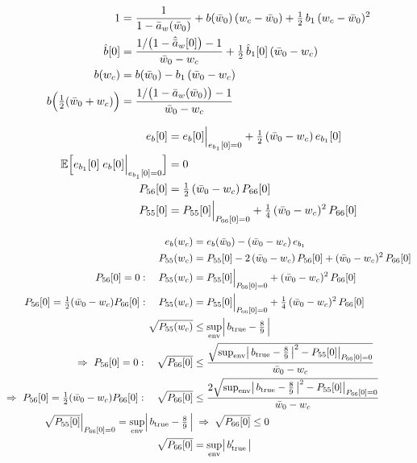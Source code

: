 \documentclass[11pt,a4paper,fontset=none]{ctexart}
\newcommand{\ba}{\bar{a}}
\newcommand{\bw}{\bar{w}}
\newcommand{\ah}{\hat{\ba}_w}
\newcommand{\bh}{\hat{b}}
\newcommand{\bhh}{\hat{b}_1}
\newcommand{\E}{\mathbb{E}}
\begin{document}
\begin{align*}
1 &= \frac{1}{1-\ba_w(\bw_0)} + b(\bw_0)\,(w_c - \bw_0) + \tfrac{1}{2}\,b_1\,(w_c - \bw_0)^{2} \\
\bh[0] &= \frac{1/\bigl(1-\ah[0]\bigr) - 1}{\bw_0 - w_c} + \tfrac{1}{2}\,\bhh[0]\,(\bw_0 - w_c) \\
b(w_c) &= b(\bw_0) - b_1\,(\bw_0 - w_c) \\
b\Bigl(\tfrac{1}{2}(\bw_0 + w_c)\Bigr) &= \frac{1/\bigl(1-\ba_w(\bw_0)\bigr) - 1}{\bw_0 - w_c}
\end{align*}

\begin{align*}
e_b[0] &= e_b[0]\Big|_{e_{b_1}[0] = 0} + \tfrac{1}{2}\,(\bw_0 - w_c)\,e_{b_1}[0] \\
\E\Bigl[e_{b_1}[0]\;e_b[0]\Big|_{e_{b_1}[0] = 0}\Bigr] &= 0 \\
P_{56}[0] &= \tfrac{1}{2}\,(\bw_0 - w_c)\,P_{66}[0] \\
P_{55}[0] &= P_{55}[0]\Big|_{P_{66}[0] = 0} + \tfrac{1}{4}\,(\bw_0 - w_c)^{2}\,P_{66}[0]
\end{align*}

\begin{align*}
e_b(w_c) &= e_b(\bw_0) - (\bw_0 - w_c)\,e_{b_1} \\
P_{55}(w_c) &= P_{55}[0] - 2\,(\bw_0 - w_c)\,P_{56}[0] + (\bw_0 - w_c)^{2}\,P_{66}[0] \\
P_{56}[0] = 0 :\quad P_{55}(w_c) &= P_{55}[0]\Big|_{P_{66}[0] = 0} + (\bw_0 - w_c)^{2}\,P_{66}[0] \\
P_{56}[0] = \tfrac{1}{2}(\bw_0 - w_c)P_{66}[0] :\quad P_{55}(w_c) &= P_{55}[0]\Big|_{P_{66}[0] = 0} + \tfrac{1}{4}\,(\bw_0 - w_c)^{2}\,P_{66}[0] \\
\sqrt{P_{55}(w_c)} &\le \sup_{\text{env}}\Bigl|\,b_{\mathrm{true}} - \tfrac{8}{9}\,\Bigr| \\
\Rightarrow\ P_{56}[0] = 0 :\quad \sqrt{P_{66}[0]} &\le \frac{\sqrt{\sup_{\text{env}}\bigl|\,b_{\mathrm{true}} - \frac{8}{9}\,\bigr|^{2} - P_{55}[0]\big|_{P_{66}[0] = 0}}}{\bw_0 - w_c} \\
\Rightarrow\ P_{56}[0] = \tfrac{1}{2}(\bw_0 - w_c)P_{66}[0] :\quad \sqrt{P_{66}[0]} &\le \frac{2\sqrt{\sup_{\text{env}}\bigl|\,b_{\mathrm{true}} - \frac{8}{9}\,\bigr|^{2} - P_{55}[0]\big|_{P_{66}[0] = 0}}}{\bw_0 - w_c} \\
\sqrt{P_{55}[0]}\Big|_{P_{66}[0] = 0} = \sup_{\text{env}}\Bigl|\,b_{\mathrm{true}} - \tfrac{8}{9}\,\Bigr| &\;\Rightarrow\; \sqrt{P_{66}[0]} \le 0 \\
\sqrt{P_{66}[0]} &= \sup_{\text{env}}\bigl|\,b'_{\mathrm{true}}\,\bigr|
\end{align*}
\end{document}
